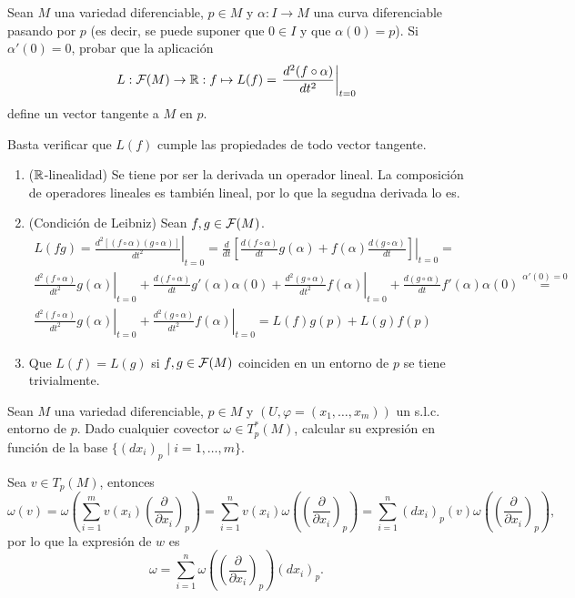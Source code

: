 \documentclass[twoside]{article}
\begin{document}
\begin{ejercicio}{3}
Sean $M$ una variedad diferenciable, $p \in M$ y $\alpha : I \to M$ una curva diferenciable
pasando por $p$ (es decir, se puede suponer que $0 \in I$ y que $\alpha(0) = p$).
Si $\alpha'(0) = 0$, probar que la aplicación
$$L:\mathcal{F}(M)\to\mathbb{R}:f\mapsto L(f)=\left.\frac{d^2(f\circ\alpha)}{dt^2}\right|_{t=0}$$
define un vector tangente a $M$ en $p$.
\end{ejercicio}
\begin{solucion}
Basta verificar que $L(f)$ cumple las propiedades de todo vector tangente. 
\begin{enumerate}
\item ($\mathbb{R}$-linealidad) Se tiene por ser la derivada un operador lineal. La composición de operadores lineales es también lineal, por lo que la segudna derivada lo es.
\item (Condición de Leibniz) Sean $f,g\in\mathcal{F}(M)$. 
\begin{gather*}
L(fg)=\left.\frac{d^2[(f\circ\alpha)(g\circ\alpha)]}{dt^2}\right|_{t=0}=\left.\frac{d}{dt}\left[\frac{d(f\circ\alpha)}{dt}g(\alpha)+f(\alpha)\frac{d(g\circ\alpha)}{dt}\right]\right|_{t=0}=\\
\left.\frac{d^2(f\circ\alpha)}{dt^2}g(\alpha)\right|_{t=0}+\frac{d(f\circ\alpha)}{dt}g'(\alpha)\alpha(0)+\left.\frac{d^2(g\circ\alpha)}{dt^2}f(\alpha)\right|_{t=0}+\frac{d(g\circ\alpha)}{dt}f'(\alpha)\alpha(0)\overset{\alpha'(0)=0}{=}\\
\left.\frac{d^2(f\circ\alpha)}{dt^2}g(\alpha)\right|_{t=0}+\left.\frac{d^2(g\circ\alpha)}{dt^2}f(\alpha)\right|_{t=0}=L(f)g(p)+L(g)f(p)
\end{gather*}
\item Que $L(f)=L(g)$ si $f,g\in\mathcal{F}(M)$ coinciden en un entorno de $p$ se tiene trivialmente.
\end{enumerate}
\end{solucion}

\newpage

\begin{ejercicio}{4}
Sean $M$ una variedad diferenciable, $p \in M$ y $(U, \varphi = (x_1, \dots , x_m))$ un s.l.c.
entorno de $p$. Dado cualquier covector $\omega \in T^*_p (M)$, calcular su expresión en
función de la base $\{(dx_i)_p \mid i = 1, \dots ,m\}$.
\end{ejercicio}
\begin{solucion}
Sea $v\in T_p(M)$, entonces
\[
\omega(v)=\omega\left(\sum_{i=1}^m v(x_i)\left(\frac{\partial}{\partial x_i}\right)_p\right)=\sum_{i=1}^nv(x_i)\omega\left(\left(\frac{\partial}{\partial x_i}\right)_p\right)=\sum_{i=1}^n(dx_i)_p(v)\omega\left(\left(\frac{\partial}{\partial x_i}\right)_p\right),
\]
por lo que la expresión de $w$ es
$$\omega=\sum_{i=1}^n\omega\left(\left(\frac{\partial}{\partial x_i}\right)_p\right)(dx_i)_p.$$
\end{solucion}
\end{document}

